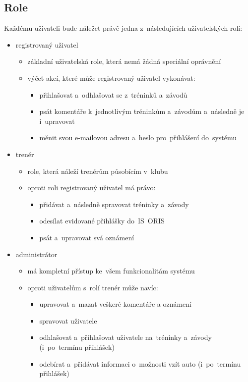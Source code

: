 \subsection{Role}
\label{section:role}
Každému uživateli bude náležet právě jedna z~následujících uživatelských rolí:
\begin{itemize}
	\item registrovaný uživatel
	\begin{itemize}[topsep=0pt]
		\item základní uživatelská role, která nemá žádná speciální oprávnění
		\item výčet akcí, které může registrovaný uživatel vykonávat:
		\begin{itemize}
			\item přihlašovat a~odhlašovat se z~tréninků a~závodů
			\item psát komentáře k~jednotlivým tréninkům a~závodům a~následně je i~upravovat
			\item měnit svou e-mailovou adresu a~heslo pro~přihlášení do~systému
		\end{itemize}
	\end{itemize}
	\item trenér
	\begin{itemize}[topsep=0pt]
		\item role, která náleží trenérům působícím v~klubu
		\item oproti roli registrovaný uživatel má právo:
		\begin{itemize}
			\item přidávat a~následně spravovat tréninky a~závody
			\item odesílat evidované přihlášky do~IS~ORIS
			\item psát a~upravovat svá oznámení
		\end{itemize}
	\end{itemize}
	\item administrátor
	\begin{itemize}[topsep=0pt]
		\item má kompletní přístup ke~všem funkcionalitám systému
		\item oproti uživatelům s~rolí trenér může navíc:
		\begin{itemize}
			\item upravovat a~mazat veškeré komentáře a oznámení
			\item spravovat uživatele
			\item odhlašovat a~přihlašovat uživatele na~tréninky a~závody (i~po~termínu přihlášek)
			\item odebírat a~přidávat informaci o~možnosti vzít auto (i~po~termínu přihlášek)
		\end{itemize}
	\end{itemize}
\end{itemize}
